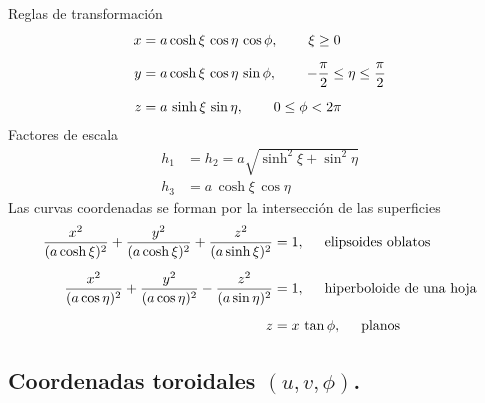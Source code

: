 \documentclass[hidelinks,12pt]{article}
\begin{document}
Reglas de transformación
\begin{align*}
    x &= a \cosh \xi \, \cos \eta \, \cos \phi, \hspace{0.75cm} \xi \geq 0 \\[0.5em]
    y &= a \cosh \xi \, \cos \eta \, \sin \phi, \hspace{0.75cm} - \dfrac{\pi}{2} \leq \eta \leq \dfrac{\pi}{2} \\[0.5em]
    z &= a \, \sinh \xi \, \sin \eta, \hspace{0.75cm} 0 \leq \phi < 2 \pi
\end{align*}
Factores de escala
\begin{align*}
    h_{1} &= h_{2} = a \sqrt{\sinh^{2} \xi + \sin^{2} \eta} \\
    h_{3} &= a \, \cosh \xi \, \cos \eta
\end{align*}
Las curvas coordenadas se forman por la intersección de las superficies
\begin{align*}
    \dfrac{x^{2}}{(a \cosh \xi)^{2}} + \dfrac{y^{2}}{(a \cosh \xi)^{2}} + \dfrac{z^{2}}{(a \sinh \xi)^{2}}  &= 1, \hspace{0.5cm} \text{elipsoides oblatos} \\[0.5em]
    \dfrac{x^{2}}{(a \cos \eta)^{2}} + \dfrac{y^{2}}{(a \cos \eta)^{2}} - \dfrac{z^{2}}{(a \sin \eta)^{2}} &= 1, \hspace{0.5cm} \text{hiperboloide de una hoja} \\[0.5em]
    z &= x \, \tan \phi, \hspace{0.5cm} \text{planos}
\end{align*}

\subsection{Coordenadas toroidales \texorpdfstring{$(u, v, \phi)$}{(u, v, f)}.}
\end{document}

